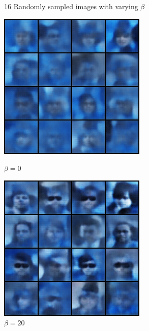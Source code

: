 \documentclass[11pt]{article}
\numberwithin{equation}{section}
\begin{document}
\begin{figure}[h]
  \caption{16 Randomly sampled images with varying $\beta$}
  \label{fig:samples}
    \centering
    \begin{minipage}{0.4\textwidth}
        \includegraphics[width=\textwidth]{ex02/beta0.0-generated.png}
        \caption{$\beta =0$ }
    \end{minipage}
    \hspace{2cm}
    \begin{minipage}{0.4\textwidth}
        \includegraphics[width=\textwidth]{ex02/beta20.0-generated.png}
        \caption{$\beta =20$}
    \end{minipage}
\end{figure}
\end{document}
